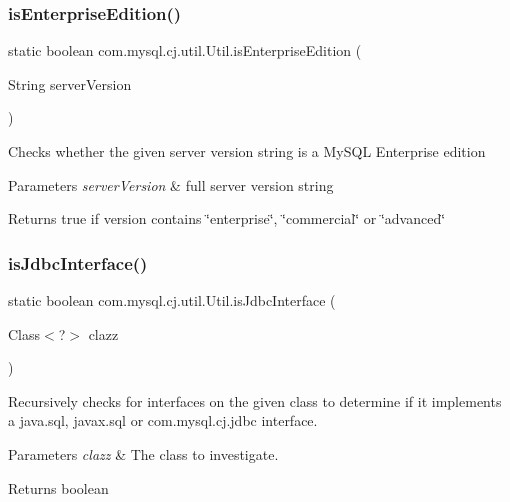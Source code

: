 \subsubsection{\texorpdfstring{is\+Enterprise\+Edition()}{isEnterpriseEdition()}}
{\footnotesize\ttfamily static boolean com.\+mysql.\+cj.\+util.\+Util.\+is\+Enterprise\+Edition (\begin{DoxyParamCaption}\item[{String}]{server\+Version }\end{DoxyParamCaption})\hspace{0.3cm}{\ttfamily [static]}}

Checks whether the given server version string is a My\+S\+QL Enterprise edition


\begin{DoxyParams}{Parameters}
{\em server\+Version} & full server version string \\
\hline
\end{DoxyParams}
\begin{DoxyReturn}{Returns}
true if version contains \char`\"{}enterprise\char`\"{}, \char`\"{}commercial\char`\"{} or \char`\"{}advanced\char`\"{} 
\end{DoxyReturn}
\mbox{\label{classcom_1_1mysql_1_1cj_1_1util_1_1_util_a6c781a9f788160ce358b6237b4a6b0da}} 
\subsubsection{\texorpdfstring{is\+Jdbc\+Interface()}{isJdbcInterface()}}
{\footnotesize\ttfamily static boolean com.\+mysql.\+cj.\+util.\+Util.\+is\+Jdbc\+Interface (\begin{DoxyParamCaption}\item[{Class$<$?$>$}]{clazz }\end{DoxyParamCaption})\hspace{0.3cm}{\ttfamily [static]}}

Recursively checks for interfaces on the given class to determine if it implements a java.\+sql, javax.\+sql or com.\+mysql.\+cj.\+jdbc interface.


\begin{DoxyParams}{Parameters}
{\em clazz} & The class to investigate. \\
\hline
\end{DoxyParams}
\begin{DoxyReturn}{Returns}
boolean 
\end{DoxyReturn}
\mbox{\label{classcom_1_1mysql_1_1cj_1_1util_1_1_util_a4ff66f7ccc05ec9631b13bb5e9e9fbbe}} 
